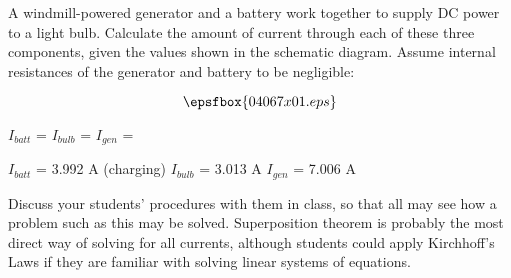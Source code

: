 

A windmill-powered generator and a battery work together to supply DC power to a light bulb.  Calculate the amount of current through each of these three components, given the values shown in the schematic diagram.  Assume internal resistances of the generator and battery to be negligible:

$$\epsfbox{04067x01.eps}$$

$I_{batt}$ = \hskip 100pt $I_{bulb}$ = \hskip 100pt $I_{gen}$ =

\vskip 10pt







$I_{batt}$ = 3.992 A (charging) \hskip 75pt $I_{bulb}$ = 3.013 A \hskip 75pt $I_{gen}$ = 7.006 A







Discuss your students' procedures with them in class, so that all may see how a problem such as this may be solved.  Superposition theorem is probably the most direct way of solving for all currents, although students could apply Kirchhoff's Laws if they are familiar with solving linear systems of equations.





